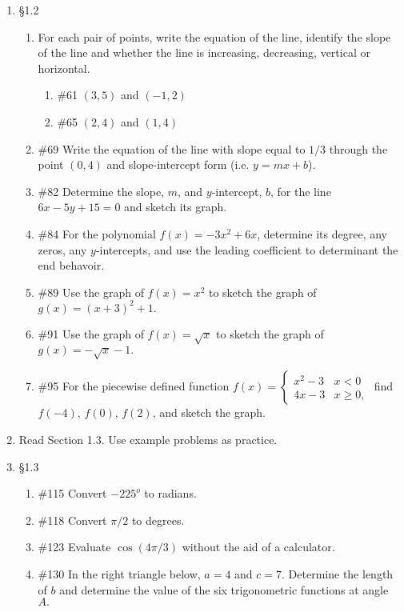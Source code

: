 \documentclass[11pt]{report}
\theoremstyle{plain}
\begin{document}
\begin{enumerate}
\item{\S 1.2} 
	\begin{enumerate} 
	\item For each pair of points, write the equation of the line, identify the slope of the line and whether the line is increasing, decreasing, vertical or horizontal.
		\begin{enumerate}
		\item \#61 $(3,5)$ and $(-1,2)$
		\item \#65 $(2,4)$ and $(1,4)$
		\end{enumerate}
	\item \#69 Write the equation of the line with slope equal to $1/3$ through the point $(0,4)$ and slope-intercept form (i.e. $y=mx+b$).
	\item \#82 Determine the slope, $m$, and $y$-intercept, $b$, for the line $6x-5y+15=0$ and sketch its graph.
	\item \#84 For the polynomial $f(x)=-3x^2+6x$, determine its degree, any zeros, any $y$-intercepts, and use the leading coefficient to determinant the end behavoir.
	\item \#89 Use the graph of $f(x)=x^2$ to sketch the graph of $g(x)=(x+3)^2+1.$
	\item \#91 Use the graph of $f(x)=\sqrt{x}$ to sketch the graph of $g(x)=-\sqrt{x}-1.$
	\item \#95 For the piecewise defined function $f(x)= \begin{cases} x^2-3 & x<0 \\ 4x-3 & x\geq 0, \end{cases}$ find $f(-4)$, $f(0)$, $f(2)$, and sketch the graph.\\
	\end{enumerate}
\item Read Section 1.3. Use example problems as practice.
\item{\S 1.3} 
	\begin{enumerate}
	\item \#115 Convert $-225^o$ to radians.
	\item \#118 Convert $\pi/2$ to degrees.
	\item \#123 Evaluate $\cos(4 \pi/3)$ without the aid of a calculator.
	\item \#130 In the right triangle below, $a=4$ and $c=7.$ Determine the length of $b$ and determine the value of the six trigonometric functions at angle $A.$ 
	

\end{enumerate}
\end{enumerate}
\end{document}
